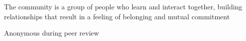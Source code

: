 \documentclass[manuscript,screen,review]{acmart}
\begin{document}











The community is a group of people who learn and interact together, building relationships that result in a feeling of belonging and mutual commitment~\cite{wenger2010communities}







\begin{acks}
Anonymous during peer review
\end{acks}




\end{document}
